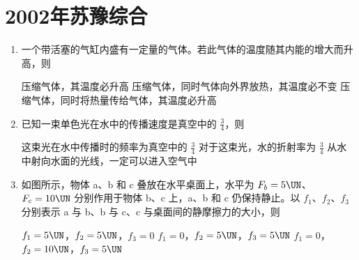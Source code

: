 \documentclass[\gkver]{gaokaozhenti}
\begin{document}
\chapter{2002年苏豫综合}

\begin{enumerate}
\item
一个带活塞的气缸内盛有一定量的气体。若此气体的温度随其内能的增大而升高，则

{压缩气体，其温度必升高}
{压缩气体，同时气体向外界放热，其温度必不变}
{压缩气体，同时将热量传给气体，其温度必升高}


\item
已知一束单色光在水中的传播速度是真空中的 $\frac{3}{4}$，则

{这束光在水中传播时的频率为真空中的 $\frac{3}{4}$}
{对于这束光，水的折射率为 $\frac{3}{4}$}
{从水中射向水面的光线，一定可以进入空气中}


\item
如图所示，物体 a、b 和 c 叠放在水平桌面上，水平为 $F_{b}=5\UN$、$F_{c}=10\UN$ 分别作用于物体 b、c 上，a、b 和 c 仍保持静止。以 $f_{1}$、$f_{2}$、$f_{3}$ 分别表示 a 与 b、b 与 c、c 与桌面间的静摩擦力的大小，则

\onepicture[w=4.29cm]{}

{$f_{1}=5\UN$，$f_{2}=5\UN$，$f_{3}=0$}
{$f_{1}=0$，$f_{2}=5\UN$，$f_{3}=5\UN$}
{$f_{1}=0$，$f_{2}=10\UN$，$f_{3}=5\UN$}



\end{enumerate}
\end{document}
